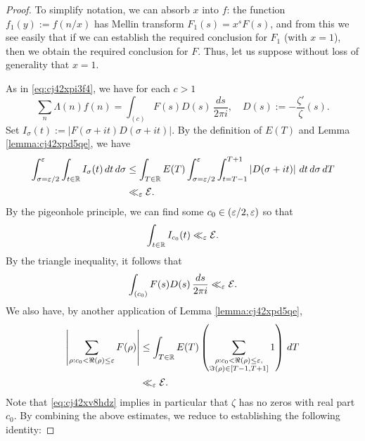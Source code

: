 \documentclass[reqno]{amsart}  \numberwithin{theorem}{section} \numberwithin{equation}{section}
\begin{document}
\begin{proof}
  To simplify notation, we can absorb $x$ into $f$: the function $f_1(y) := f(n/x)$ has Mellin transform $F_1(s) = x^s F(s)$, and from this we see easily that if we can establish the required conclusion for $F_1$ (with $x=1$), then we obtain the required conclusion for $F$.  Thus, let us suppose without loss of generality that $x = 1$.
  
  As in \eqref{eq:cj42xpi3f4}, we have for each $c > 1$
  \begin{equation*}
    \sum_n \Lambda (n) f \left( n \right)
    =
    \int_{(c)} F (s) D(s) \, \frac{d s}{2 \pi i},
    \quad
    D(s) := -\frac{\zeta ' }{\zeta }(s).
  \end{equation*}
  Set $I_\sigma(t) := \lvert F(\sigma + i t) D(\sigma + it) \rvert$.  By the definition of $E(T)$ and Lemma \ref{lemma:cj42xpd5qe}, we have
  \begin{align*}
    \int_{\sigma = \varepsilon / 2}^{\varepsilon}
    \int_{t \in \mathbb{R}}
    I_\sigma(t)
    \, d t
    \, d \sigma
    &\leq \int_{T \in \mathbb{R} } E(T)
      \int_{\sigma = \varepsilon / 2 }^{\varepsilon }
      \int_{t = T - 1}^{T + 1}
      \left\lvert D(\sigma+it) \right\rvert
      \, d t
      \, d \sigma \, d T \\
    &\ll_{\varepsilon} \mathcal{E}.
  \end{align*}
  By the pigeonhole principle, we can find some $c_0 \in (\varepsilon/2, \varepsilon)$ so that
  \begin{equation}\label{eq:cj42xv8hdz}
    \int_{t \in \mathbb{R} } I_{c_0} (t) \ll_{\varepsilon} \mathcal{E}.
  \end{equation}
  By the triangle inequality, it follows that
  \begin{equation*}
    \int_{(c_0)} F(s) D(s) \, \frac{d s}{2 \pi i } \ll _{\varepsilon} \mathcal{E}.
  \end{equation*}
  We also have, by another application of Lemma \ref{lemma:cj42xpd5qe},
  \begin{align*}
    \left\lvert \sum_{\rho : c_0 < \Re(\rho) \leq \varepsilon } F(\rho)  \right\rvert
    &\leq \int_{T \in \mathbb{R} }  E(T)
      \left(
      \sum_{
      \substack{
      \rho : c_0 < \Re(\rho) \leq \varepsilon,  \\
    \Im(\rho) \in [T-1, T+1]
    }
    }
    1
    \right)
    \, d T \\
    &\ll_{\varepsilon}\mathcal{E}.
  \end{align*}
  Note that \eqref{eq:cj42xv8hdz} implies in particular that $\zeta$ has no zeros with real part $c_0$.  By combining the above estimates, we reduce to establishing the following identity:

\end{proof}
\end{document}

